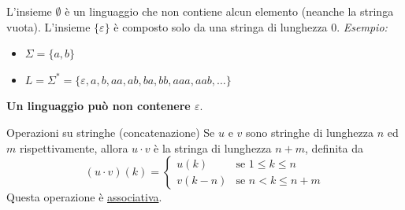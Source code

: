 \documentclass[12pt, a4paper]{report}
\begin{document}
            L'insieme $\emptyset$ è un linguaggio che non contiene alcun elemento (neanche la stringa vuota). 
            L'insieme $\{\varepsilon\}$ è composto solo da una stringa di lunghezza 0. 
            \textit{Esempio:}
            \begin{itemize}
                \item $\Sigma=\{a,b\}$ 
                \item $L=\Sigma^*=\{\varepsilon, a, b, aa, ab, ba, bb, aaa, aab, \ldots\}$ 
            \end{itemize}
            \textbf{Un linguaggio può non contenere $\varepsilon$}. 
            \begin{definitionbox}{Operazioni su stringhe (concatenazione)}{}
                Se $u$ e $v$ sono stringhe di lunghezza $n$ ed $m$ rispettivamente, allora $u\cdot v$ è la stringa di lunghezza $n+m$, definita da 
                \begin{equation*}
                    (u\cdot v)(k)=\begin{cases}
                        u(k) & \text{se } 1\leq k\leq n\\
                        v(k-n) & \text{se } n<k\leq n+m 
                    \end{cases}
                \end{equation*}
                Questa operazione è \underline{associativa}. 
            \end{definitionbox}
\end{document}
